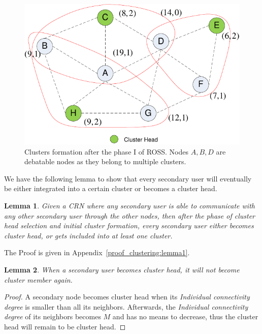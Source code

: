 \documentclass[times]{ettauth}
\newcommand{\eg}{e.g., }
\newcommand{\ie}{i.e., }
\theoremstyle{mytheoremstyle}
\theoremstyle{mytheoremstyle}
\theoremstyle{mytheoremstyle}
\newtheorem{lemma}{Lemma}[section]
\begin{document}
\begin{figure}[ht!]
  \centering
  \includegraphics[width=0.5\linewidth]{figure2.pdf}
  \caption{Clusters formation after the phase I of ROSS. Nodes $A, B, D$ are debatable nodes as they belong to multiple clusters.}
  \label{fig2}
\end{figure}


We have the following lemma to show that every secondary user will eventually be either integrated into a certain cluster or becomes a cluster head.

\begin{lemma}
\label{clustering:lemma1}
Given a CRN where any secondary user is able to communicate with any other secondary user through the other nodes, then after the phase of cluster head selection and initial cluster formation, every secondary user either becomes cluster head, or gets included into at least one cluster.
\end{lemma}

The Proof is given in Appendix~\ref{proof_clustering:lemma1}.
%

\begin{lemma}
\label{clustering:lemma2}
When a secondary user becomes cluster head, it will not become cluster member again.
\end{lemma}
\begin{proof}
A secondary node becomes cluster head when its \textit{Individual connectivity degree} is smaller than all its neighbors.
Afterwards, the \textit{Individual connectivity degree} of its neighbors becomes $M$ and has no means to decrease, thus the cluster head will remain to be cluster head.
\end{proof}
\end{document}
